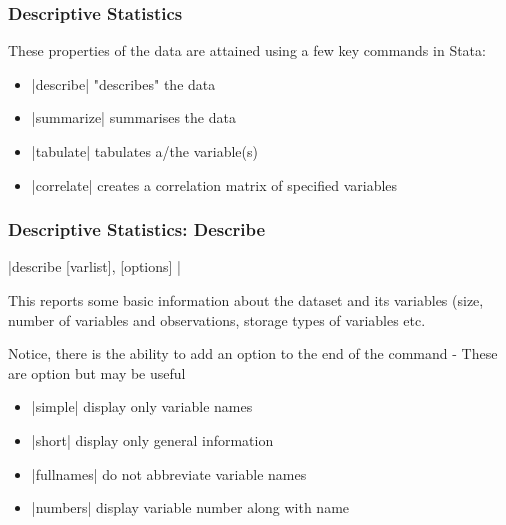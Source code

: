 \documentclass[10pt, compress]{beamer}
\begin{document}
\begin{frame}[fragile]
\frametitle{Descriptive Statistics}

These properties of the data are attained using a few key commands in Stata:

\begin{itemize}
 \item {}|describe|  \alert{"describes" the data}
 \item 	{}|summarize|  \alert{summarises the data}
 \item  {}|tabulate|  \alert{tabulates a/the variable(s)}
 \item {}|correlate| \alert{creates a correlation matrix of specified variables}  
\end{itemize}

\end{frame}

\begin{frame}[fragile]
\frametitle{Descriptive Statistics: Describe}

\begin{center}
|describe [varlist], [options] |
\end{center}

This reports some basic information about the dataset and its variables (size, number of variables and observations, storage types of variables etc.

Notice, there is the ability to add an option to the end of the command - \alert{These are option but may be useful}
\begin{itemize}
\item {}|simple| display only variable names
\item {}|short| display only general information
\item {}|fullnames| do not abbreviate variable names
\item {}|numbers| display variable number along with name
\end{itemize}
\end{frame}
\end{document}
